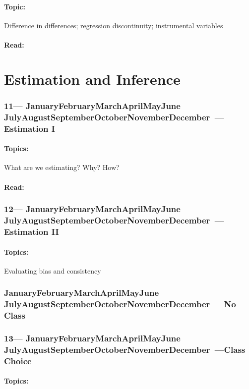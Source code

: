 \documentclass[10pt]{article}
\def\themonth{\ifcase\month\or
	January\or February\or March\or April\or May\or June\or
	July\or August\or September\or October\or November\or December\fi}
\begin{document}
\subsection{Topic:} Difference in differences; regression discontinuity;
instrumental variables
\subsection{Read:}

\part{Estimation and Inference}

\AdvanceDate[7]

\section{11---\themonth~\the\day---Estimation I}

\subsection{Topics:} What are we estimating? Why? How?
\subsection{Read:}

\AdvanceDate[7]
\section{12---\themonth~\the\day---Estimation II}

\subsection{Topics:} Evaluating bias and consistency

\AdvanceDate[7]
\section{\themonth~\the\day---No Class}

\AdvanceDate[7]
\section{13---\themonth~\the\day---Class Choice}
\subsection{Topics:}
\end{document}
